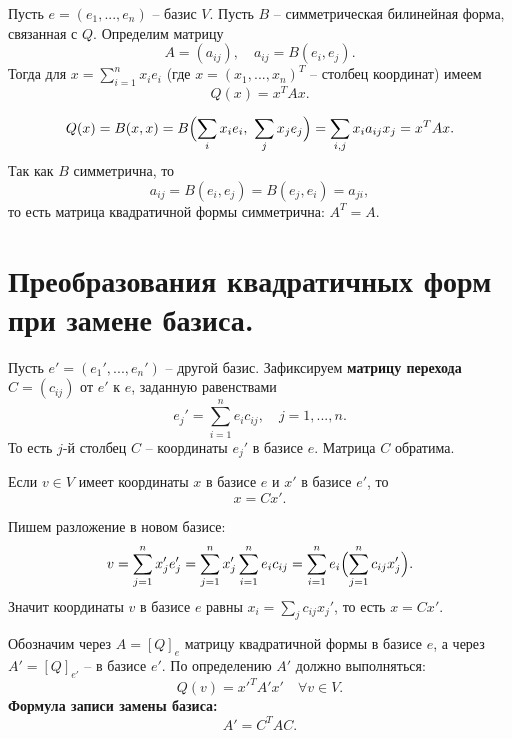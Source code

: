\documentclass[14pt]{extreport}
\begin{document}
    \begin{thbox}
        Пусть $e = (e_1,...,e_n)$ – базис $V$. Пусть $B$ – симметрическая билинейная форма, связанная с $Q$. Определим матрицу
        \[
        A = (a_{ij}), \quad a_{ij} = B(e_i,e_j).
        \]
        Тогда для $x = \sum_{i=1}^n x_ie_i$ (где $x = (x_1,...,x_n)^T$ – столбец координат) имеем
        \[
        Q(x) = x^T A x.
        \]
    \end{thbox}

    \begin{prbox}
        \[
        Q(x) = B(x,x) = B \Bigl( \sum_i x_ie_i,\ \sum_j x_je_j \Bigr) = \sum_{i,j} x_ia_{ij}x_j = x^TAx.
        \]
        Так как $B$ симметрична, то
        \[
        a_{ij} = B(e_i, e_j) = B(e_j, e_i) = a_{ji},
        \]
        то есть матрица квадратичной формы симметрична: $A^T = A$.
    \end{prbox}



    \chapter{Преобразования квадратичных форм при замене базиса.}

    \begin{defbox}
        Пусть $e' = (e_1',...,e_n')$ – другой базис. Зафиксируем \textbf{матрицу перехода} $C = (c_{ij})$ от $e'$ к $e$, заданную равенствами
        \[
        e_j' = \sum_{i=1}^n e_ic_{ij}, \quad j = 1,...,n.
        \]
        То есть $j$-й столбец $C$ – координаты $e_j'$ в базисе $e$. Матрица $C$ обратима.
    \end{defbox}

    \begin{thbox}
        Если $v \in V$ имеет координаты $x$ в базисе $e$ и $x'$ в базисе $e'$, то
        \[
        x = Cx'.
        \]
    \end{thbox}

    \begin{prbox}
        Пишем разложение в новом базисе:
        \[
        v = \sum_{j=1}^n x_j'e_j' = \sum_{j=1}^n x_j' \sum_{i=1}^n e_ic_{ij} = \sum_{i=1}^n e_i \Bigl( \sum_{j=1}^n c_{ij}x_j' \Bigr).
        \]
        Значит координаты $v$ в базисе $e$ равны $x_i = \sum_j c_{ij}x_j'$, то есть $x = Cx'$.
    \end{prbox}

    \begin{thbox}
        Обозначим через $A = [Q]_e$ матрицу квадратичной формы в базисе $e$, а через $A' = [Q]_{e'}$ – в базисе $e'$. По определению $A'$ должно выполняться:
        \[
        Q(v) = x'^T A' x' \quad \forall v \in V.
        \]
        \textbf{Формула записи замены базиса:}
        \[
        A' = C^TAC.
        \]
    \end{thbox}
\end{document}
